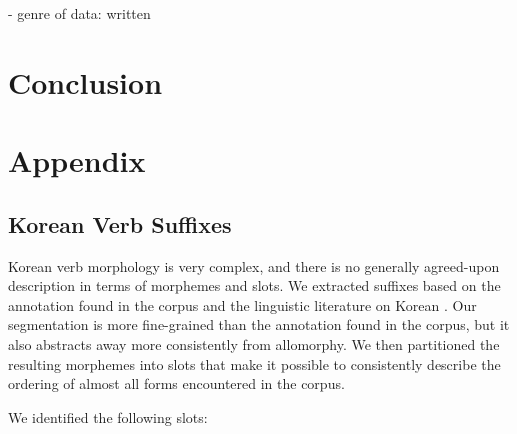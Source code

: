 \documentclass[11pt,letterpaper]{article}
\begin{document}
- genre of data: written



\section{Conclusion}



\appendix

\section{Appendix}



\subsection{Korean Verb Suffixes}

Korean verb morphology is very complex, and there is no generally agreed-upon description in terms of morphemes and slots.
We extracted suffixes based on the annotation found in the corpus and the linguistic literature on Korean \citep[4.1.2]{yeon2010korean}.
Our segmentation is more fine-grained than the annotation found in the corpus, but it also abstracts away more consistently from allomorphy.
We then partitioned the resulting morphemes into slots that make it possible to consistently describe the ordering of almost all forms encountered in the corpus.


We identified the following slots:
\end{document}
